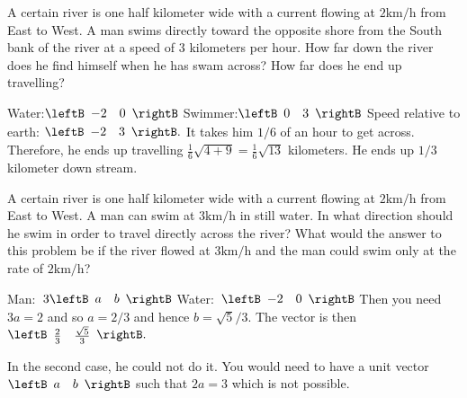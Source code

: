 \begin{enumialphparenastyle}
\begin{ex} A certain river is one half kilometer wide with a current flowing at $2\textrm{km}/\textrm{h}$ from East to West. A man swims directly toward the
opposite shore from the South bank of the river at a speed of $3$ kilometers
per hour. How far down the river does he find himself when he has swam
across? How far does he end up travelling? \vspace{1mm}
\begin{sol}
Water:$\leftB \begin{array}{rr}
-2 & 0
\end{array}
\rightB $ 
Swimmer:$\leftB \begin{array}{rr}
0 & 3
\end{array}
\rightB $ 
Speed relative to earth: $\leftB
\begin{array}{rr}
 -2 & 3
\end{array}
\rightB .$ 
It takes him $1/6$ of an hour to get across. Therefore, he ends up travelling $\frac{1}{6}\sqrt{4+9}= \frac{1}{6}\sqrt{13}$ kilometers. He ends up $1/3$ kilometer
down stream.
\end{sol}
\end{ex}

\begin{ex} A certain river is one half kilometer wide with a current flowing at $2\textrm{km}/\textrm{h}$ from East to West. A man can swim at $3\textrm{km}/\textrm{h}$ in
still water. In what direction should he swim in order to travel directly
across the river? What would the answer to this problem be if the river
flowed at $3\textrm{km}/\textrm{h}$ and the man could swim only at the rate of $2\textrm{km}/\textrm{h}$? \vspace{1mm}
\begin{sol}
Man:\ $3\leftB \begin{array}{rr}
 a & b
\end{array}
\rightB $ 
Water:\ $\leftB \begin{array}{rr}
-2 & 0
\end{array}
\rightB $
Then you need $3a=2$ and so $a=2/3$ and hence $b=\sqrt{5}/3$. The vector is
then $\leftB \begin{array}{cc}
 \frac{2}{3} & \frac{\sqrt{5}}{3}
\end{array}
\rightB .$ 

In the second case, he
could not do it. You would need to have a unit vector $\leftB \begin{array}{rr} a & b
\end{array}
\rightB $
such that $2a=3$ which is not possible. 
\end{sol}
\end{ex}



\end{enumialphparenastyle}
